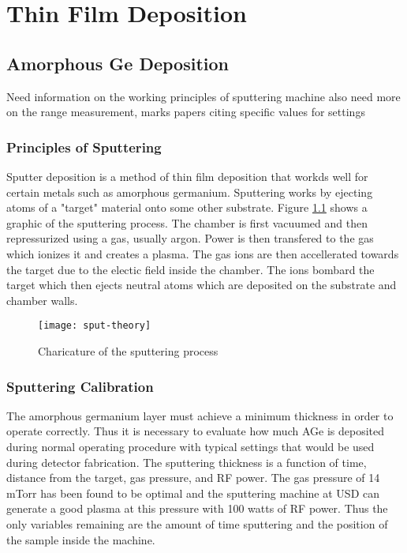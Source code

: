\chapter{Thin Film Deposition}
\section{Amorphous Ge Deposition}

Need information on the working principles of sputtering machine
also need more on the range measurement, marks papers citing specific values for settings
\subsection{Principles of Sputtering}
Sputter deposition is a method of thin film deposition that workds well for certain metals such as amorphous germanium.
Sputtering works by ejecting atoms of a "target" material onto some other substrate.
Figure \ref{fig:sput-theory} shows a graphic of the sputtering process.
The chamber is first vacuumed and then repressurized using a gas, usually argon.
Power is then transfered to the gas which ionizes it and creates a plasma.
The gas ions are then accellerated towards the target due to the electic field inside the chamber.
The ions bombard the target which then ejects neutral atoms which are deposited on the substrate and chamber walls.

\begin{figure}[htpb]
\centering
\texttt{[image: sput-theory]}
\caption{Charicature of the sputtering process}
\label{fig:sput-theory}
\end{figure}

\subsection{Sputtering Calibration}
The amorphous germanium layer must achieve a minimum thickness in order to operate correctly.
Thus it is necessary to evaluate how much AGe is deposited during normal operating procedure with typical settings that would be used during detector fabrication.
The sputtering thickness is a function of time, distance from the target, gas pressure, and RF power.
The gas pressure of 14 mTorr has been found to be optimal and the sputtering machine at USD can generate a good plasma at this pressure with 100 watts of RF power.
Thus the only variables remaining are the amount of time sputtering and the position of the sample inside the machine.

